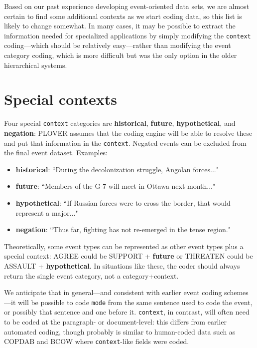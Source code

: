 \documentclass[11pt]{report}
\newcommand{\plcat}[1]{\textsf{#1}}
\newcommand{\plcon}[1]{\textbf{#1}}
\newcommand{\txt}[1]{\texttt{#1}}
\begin{document}
Based on our past experience developing event-oriented data sets, we are almost certain to find some additional contexts as we start coding data, so this list is likely to change somewhat.  In many cases, it may be possible to extract the information needed for specialized applications by simply modifying the \txt{context} coding---which should be relatively easy---rather than modifying the event category coding, which is more difficult but was the only option in the older hierarchical systems.

\newpage

\section{Special contexts}\label{ssec:special}

Four special \txt{context} categories are \plcon{historical}, \plcon{future}, \plcon{hypothetical}, and \plcon{negation}: PLOVER assumes that the coding engine will be able to resolve these and put that information in the \txt{context}. Negated events can be excluded from the final event dataset. Examples:
   \begin{itemize}
   \item \plcon{historical}: ``During the decolonization struggle, Angolan forces..."
   \item \plcon{future}: ``Members of the G-7 will meet in Ottawa next month..."
   \item \plcon{hypothetical}: ``If Russian forces were to cross the border, that would represent a major..."
   \item \plcon{negation}: ``Thus far, fighting has not re-emerged in the tense region."	
   \end{itemize}
  
Theoretically, some event types can be represented as other event types plus a special context: \plcat{AGREE} could be  \plcat{SUPPORT} + \plcon{future} or \plcat{THREATEN} could be \plcat{ASSAULT} + \plcon{hypothetical}. In situations like these, the coder should always return the single event category, not a category+context.

We anticipate that in general---and consistent with earlier event coding schemes---it will be possible to code \txt{mode} from the same sentence used to code the event, or possibly that sentence and one before it. \txt{context}, in contrast, will often need to be coded at the paragraph- or document-level: this differs from earlier automated coding, though probably is similar to human-coded data such as COPDAB and BCOW \citep{Leng87} where \txt{context}-like fields were coded.
\end{document}
